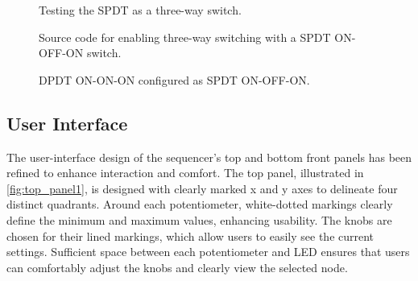 \documentclass[12pt]{article}
\numberwithin{subsubsubsection}{subsubsection}
\begin{document}
\begin{figure}[ht]
    \centering
    \caption{Testing the SPDT as a three-way switch.}
    \label{fig:SPDT_test}
\end{figure}

\begin{figure}[H]
    \centering
    \caption{Source code for enabling three-way switching with a SPDT ON-OFF-ON switch.}
    \label{fig:SPDT_code}
\end{figure}

\begin{figure}[H]
    \centering
    \caption{DPDT ON-ON-ON configured as SPDT ON-OFF-ON.}
    \label{fig:DPDT_to_SPDT}
\end{figure}

\newpage

\subsection{User Interface}

The user-interface design of the sequencer's top and bottom front panels has been refined to enhance interaction and comfort. The top panel, illustrated in \autoref{fig:top_panel1}, is designed with clearly marked x and y axes to delineate four distinct quadrants. Around each potentiometer, white-dotted markings clearly define the minimum and maximum values, enhancing usability. The knobs are chosen for their lined markings, which allow users to easily see the current settings. Sufficient space between each potentiometer and LED ensures that users can comfortably adjust the knobs and clearly view the selected node.
\end{document}
